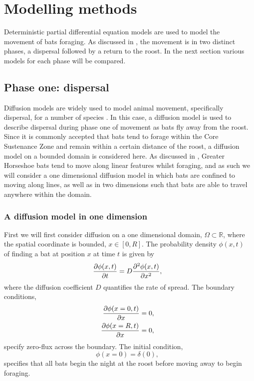 \section{Modelling methods}
%
Deterministic partial differential equation models are used to model the movement of bats foraging. As discussed in , the movement is in two distinct phases, a dispersal followed by a return to the roost. In the next section various models for each phase will be compared.

\subsection{Phase one: dispersal} \label{phase1}

Diffusion models are widely used to model animal movement, specifically dispersal, for a number of
species \cite{Ovaskainen2016}. In this case, a diffusion model is used to
describe dispersal during phase one of movement as bats fly away from the roost. Since it is commonly accepted that bats tend
to forage within the Core Sustenance Zone and remain within a certain distance
 of the roost, a diffusion model on a bounded domain is considered here. As discussed in , Greater Horseshoe bats tend to move along linear features whilst foraging, and as such we will consider a one dimensional diffusion model in which bats are confined to moving along lines, as well as in two dimensions such that bats are able to travel anywhere within the domain.

 \subsubsection{A diffusion model in one dimension}

First we will first consider diffusion on a one  dimensional domain, $\Omega \subset \mathbb{R}$, where the spatial coordinate is bounded, $x \in [0,R]$.  The probability density $\phi(x,t)$ of finding a bat at position $x$ at time $t$ is given by
 \begin{equation}
   \frac{\partial \phi(x,t)}{\partial t} = D \frac{\partial^2 \phi(x,t)}{\partial x^2} ,
   \label{eqn:diffusion_cartesian}
 \end{equation}
 where the diffusion coefficient $D$ quantifies the rate of spread. The boundary conditions,
\begin{align}
\frac{\partial \phi(x=0,t)}{\partial x} &= 0, \\
\frac{\partial \phi(x=R,t)}{\partial x} &= 0,
\label{eqn:BC1d}
\end{align}
%
specify zero-flux across the boundary. The initial condition,
%
\begin{equation}
\phi(x = 0) = \delta(0),
\label{eqn:IC1d}
\end{equation}
%
specifies that all bats begin the night at the roost before moving away to begin foraging.
%
